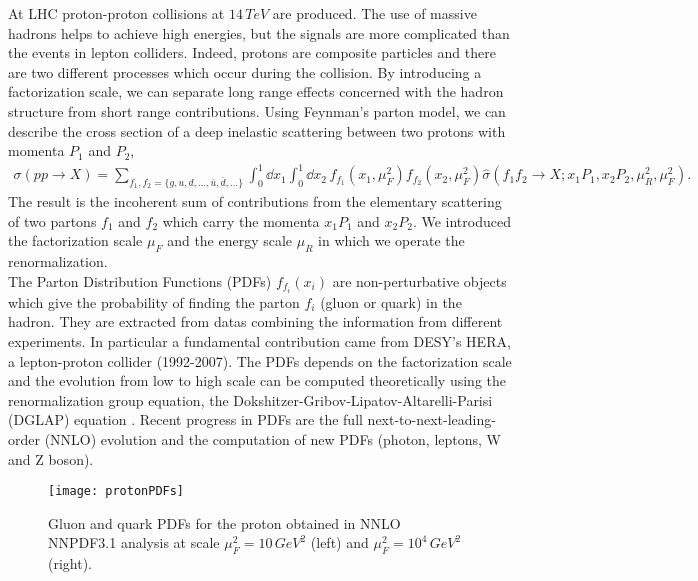 At LHC proton-proton collisions at $14\,TeV$ are produced. The use of massive hadrons helps to achieve high energies, but the signals are more complicated than the events in lepton colliders. Indeed, protons are composite particles and there are two different processes which occur during the collision. By introducing a factorization scale, we can separate long range effects concerned with the hadron structure from short range contributions. Using Feynman's parton model, we can describe the cross section of a deep inelastic scattering between two protons with momenta $P_1$ and $P_2$,
\begin{align*}
	\sigma(pp\rightarrow X)=\sum_{f_1,f_2=\{g,u,d,\dots,\bar u, \bar d, \dots\}}  \int_0^1 \dd x_1 \int_0^1 \dd x_2 \, f_{f_1}(x_1,\mu_F^2) f_{f_2}(x_2,\mu_F^2) \hat \sigma\left(f_1 f_2 \rightarrow X; x_1 P_1, x_2 P_2, \mu_R^2, \mu_F^2\right).
\end{align*}
The result is the incoherent sum of contributions from the elementary scattering of two partons $f_1$ and $f_2$ which carry the momenta $x_1 P_1$ and $x_2 P_2$. We introduced the factorization scale $\mu_F$ and the energy scale $\mu_R$ in which we operate the renormalization.\\
The Parton Distribution Functions (PDFs) $f_{f_i}(x_i)$ are non-perturbative objects which give the probability of finding the parton $f_i$ (gluon or quark) in the hadron. They are extracted from datas combining the information from different experiments. In particular a fundamental contribution came from DESY's HERA, a lepton-proton collider (1992-2007). The PDFs depends on the factorization scale and the evo\-lution from low to high scale can be computed theoretically using the renormalization group equation, the Dokshitzer-Gribov-Lipatov-Altarelli-Parisi (DGLAP) equation \cite{Altarelli:1977zs}. Recent progress in PDFs are the full next-to-next-leading-order (NNLO) evolution and the computation of new PDFs (photon, leptons, W and Z boson).\\
\begin{figure}[H]
\begin{center}
\texttt{[image: protonPDFs]}
\caption{Gluon and quark PDFs for the proton obtained in NNLO NNPDF3.1 analysis \cite{Ball_2017} at scale $\mu_F^2=10\,GeV^2$ (left) and $\mu_F^2=10^4\,GeV^2$ (right).}
\end{center}
\end{figure}


